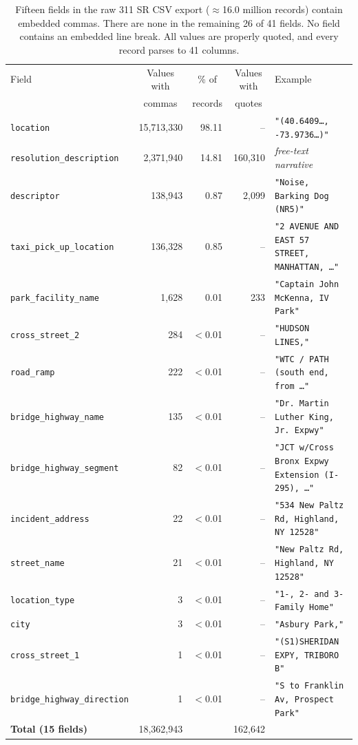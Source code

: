 \documentclass[12pt]{article}
\begin{document}
\clearpage
\begin{table}[t]
\centering
\footnotesize
\caption{Fifteen fields in the raw 311 SR CSV export ($\approx$16.0 million records)
contain embedded commas. There are none in the remaining 26 of 41 fields. 
No field contains an embedded line break. All values
are properly quoted, and every record parses to 41 columns.}
\label{tab:embedded-commas}
\begin{tabularx}{\textwidth}{@{}lrrr>{\raggedright\arraybackslash}X@{}}
\toprule
Field & \multicolumn{1}{c}{Values with} & \multicolumn{1}{c}{\% of} & \multicolumn{1}{c}{Values with} & Example \\
      & \multicolumn{1}{c}{commas}      & \multicolumn{1}{c}{records} & \multicolumn{1}{c}{quotes} & \\
\midrule
\texttt{location} & 15{,}713{,}330 & 98.11 & -- & \texttt{"(40.6409\ldots{}, -73.9736\ldots{})"} \\
\texttt{resolution\_description} & 2{,}371{,}940 & 14.81 & 160{,}310 & \textit{free-text narrative} \\
\texttt{descriptor} & 138{,}943 & 0.87 & 2{,}099 & \texttt{"Noise, Barking Dog (NR5)"} \\
\texttt{taxi\_pick\_up\_location} & 136{,}328 & 0.85 & -- & \texttt{"2 AVENUE AND EAST 57 STREET, MANHATTAN, \ldots{}"} \\
\texttt{park\_facility\_name} & 1{,}628 & 0.01 & 233 & \texttt{"Captain John McKenna, IV Park"} \\
\texttt{cross\_street\_2} & 284 & $<$0.01 & -- & \texttt{"HUDSON LINES,"} \\
\texttt{road\_ramp} & 222 & $<$0.01 & -- & \texttt{"WTC / PATH (south end, from \ldots{}"} \\
\texttt{bridge\_highway\_name} & 135 & $<$0.01 & -- & \texttt{"Dr.\ Martin Luther King, Jr. Expwy"} \\
\texttt{bridge\_highway\_segment} & 82 & $<$0.01 & -- & \texttt{"JCT w/Cross Bronx Expwy Extension (I-295), \ldots{}"} \\
\texttt{incident\_address} & 22 & $<$0.01 & -- & \texttt{"534 New Paltz Rd, Highland, NY 12528"} \\
\texttt{street\_name} & 21 & $<$0.01 & -- & \texttt{"New Paltz Rd, Highland, NY 12528"} \\
\texttt{location\_type} & 3 & $<$0.01 & -- & \texttt{"1-, 2- and 3- Family Home"} \\
\texttt{city} & 3 & $<$0.01 & -- & \texttt{"Asbury Park,"} \\
\texttt{cross\_street\_1} & 1 & $<$0.01 & -- & \texttt{"(S1)SHERIDAN EXPY, TRIBORO B"} \\
\texttt{bridge\_highway\_direction} & 1 & $<$0.01 & -- & \texttt{"S to Franklin Av, Prospect Park"} \\
\midrule
\textbf{Total (15 fields)} & 18{,}362{,}943 & & 162{,}642 & \\
\bottomrule
\end{tabularx}
\end{table}
\end{document}
